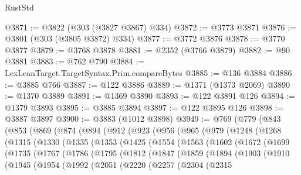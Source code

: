 \begin{lexlean}{RustStd}
\begin{coremodule}
{\begin{coremodule}
{{{{{{{{{{{{{{{{{{{{{{{{{{{{{{{{{{{{{{{{{{{{{{{{{{{{{{{{{{{{{{{{{{{{@3871 := @3822 (@303 (@3827 @3867) @334)
@3872 := @3773 @3871
@3876 := @3801 (@303 (@3805 @3872) @334)
@3877 := @3772 @3876
@3878 := @3770 @3877
@3879 := @3768 @3878
@3881 := @2352 (@3766 @3879)
@3882 := @90 @3881
@3883 := @762 @790
@3884 := LexLeanTarget.TargetSyntax.Prim.compareBytes
@3885 := @136 @3884
@3886 := @3885 @766
@3887 := @122 @3886
@3889 := @1371 (@1373 @2069)
@3890 := @1370 @3889
@3891 := @1369 @3890
@3893 := @122 @3891 @126
@3894 := @1379 @3893
@3895 := @3885 @3894
@3897 := @122 @3895 @126
@3898 := @3887 @3897
@3900 := @3883 (@1012 @3898)
@3949 := @769
    (@779
      (@843
        (@853
          (@869
            (@874
              (@894
                (@912
                  (@923
                    (@956
                      (@965
                        (@979
                          (@1248
                            (@1268
                              (@1315
                                (@1330
                                  (@1335
                                    (@1353
                                      (@1425
                                        (@1554
                                          (@1563
                                            (@1602
                                              (@1672
                                                (@1699
                                                  (@1735
                                                    (@1767
                                                      (@1786
                                                        (@1795
                                                          (@1812
                                                            (@1847
                                                              (@1859
                                                                (@1894
                                                                  (@1903
                                                                    (@1910
                                                                      (@1945
                                                                        (@1954
                                                                          (@1992
                                                                            (@2051
                                                                              (@2220
                                                                                (@2257
                                                                                  (@2304
                                                                                    (@2315
}}}}}}}}}}}}}}}}}}}}}}}}}}}}}}}}}}}}}}}}}}}}}}}}}}}}}}}}}}}}}}}}}}}}
\end{coremodule}}
\end{coremodule}
\end{lexlean}
